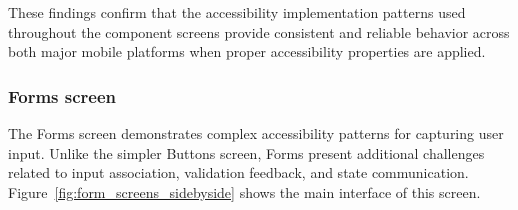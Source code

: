 These findings confirm that the accessibility implementation patterns used throughout the component screens provide consistent and reliable behavior across both major mobile platforms when proper accessibility properties are applied.

\subsubsection{Forms screen}
\label{subsubsec:forms-screen}

The Forms screen demonstrates complex accessibility patterns for capturing user input. Unlike the simpler Buttons screen, Forms present additional challenges related to input association, validation feedback, and state communication. Figure~\ref{fig:form_screens_sidebyside} shows the main interface of this screen.

